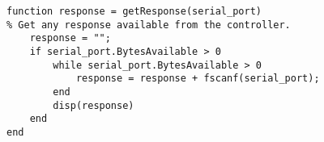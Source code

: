 \begin{lstlisting}
function response = getResponse(serial_port)
% Get any response available from the controller.
    response = "";
    if serial_port.BytesAvailable > 0
        while serial_port.BytesAvailable > 0
            response = response + fscanf(serial_port);
        end
        disp(response)
    end
end

\end{lstlisting}